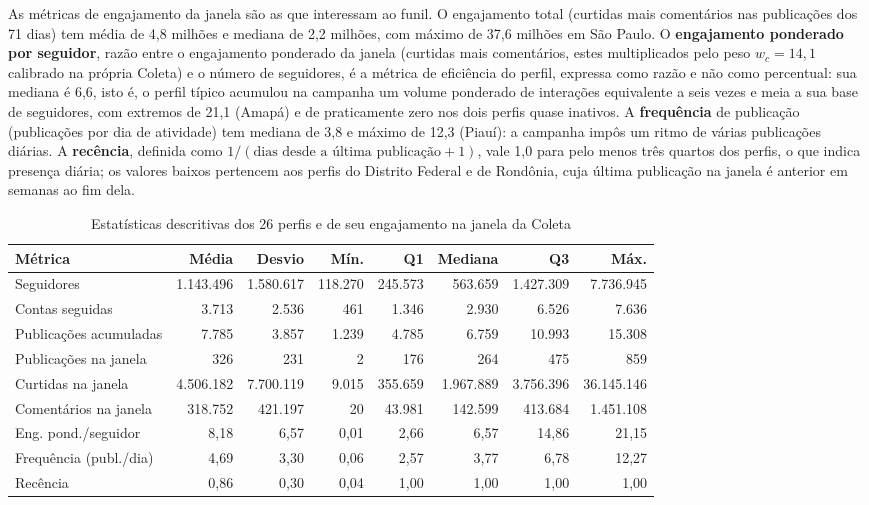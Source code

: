 As métricas de engajamento da janela são as que interessam ao funil. O engajamento total (curtidas mais comentários nas publicações dos 71 dias) tem média de 4,8 milhões e mediana de 2,2 milhões, com máximo de 37,6 milhões em São Paulo. O \textbf{engajamento ponderado por seguidor}, razão entre o engajamento ponderado da janela (curtidas mais comentários, estes multiplicados pelo peso $w_c = 14{,}1$ calibrado na própria Coleta) e o número de seguidores, é a métrica de eficiência do perfil, expressa como razão e não como percentual: sua mediana é 6,6, isto é, o perfil típico acumulou na campanha um volume ponderado de interações equivalente a seis vezes e meia a sua base de seguidores, com extremos de 21,1 (Amapá) e de praticamente zero nos dois perfis quase inativos. A \textbf{frequência} de publicação (publicações por dia de atividade) tem mediana de 3,8 e máximo de 12,3 (Piauí): a campanha impôs um ritmo de várias publicações diárias. A \textbf{recência}, definida como $1/(\text{dias desde a última publicação}+1)$, vale 1,0 para pelo menos três quartos dos perfis, o que indica presença diária; os valores baixos pertencem aos perfis do Distrito Federal e de Rondônia, cuja última publicação na janela é anterior em semanas ao fim dela.

\begin{table}[htb]
\centering
\caption{Estatísticas descritivas dos 26 perfis e de seu engajamento na janela da Coleta}
\label{tab:estatisticas_perfis}
\footnotesize\setlength{\tabcolsep}{3pt}
\setlength{\tabcolsep}{4pt}
\begin{tabular}{lrrrrrrr}
\toprule
\textbf{Métrica} & \textbf{Média} & \textbf{Desvio} & \textbf{Mín.} & \textbf{Q1} & \textbf{Mediana} & \textbf{Q3} & \textbf{Máx.} \\
\midrule
Seguidores & 1.143.496 & 1.580.617 & 118.270 & 245.573 & 563.659 & 1.427.309 & 7.736.945 \\
Contas seguidas & 3.713 & 2.536 & 461 & 1.346 & 2.930 & 6.526 & 7.636 \\
Publicações acumuladas & 7.785 & 3.857 & 1.239 & 4.785 & 6.759 & 10.993 & 15.308 \\
\midrule
Publicações na janela & 326 & 231 & 2 & 176 & 264 & 475 & 859 \\
Curtidas na janela & 4.506.182 & 7.700.119 & 9.015 & 355.659 & 1.967.889 & 3.756.396 & 36.145.146 \\
Comentários na janela & 318.752 & 421.197 & 20 & 43.981 & 142.599 & 413.684 & 1.451.108 \\
Eng. pond./seguidor & 8,18 & 6,57 & 0,01 & 2,66 & 6,57 & 14,86 & 21,15 \\
Frequência (publ./dia) & 4,69 & 3,30 & 0,06 & 2,57 & 3,77 & 6,78 & 12,27 \\
Recência & 0,86 & 0,30 & 0,04 & 1,00 & 1,00 & 1,00 & 1,00 \\
\bottomrule
\end{tabular}
\end{table}

